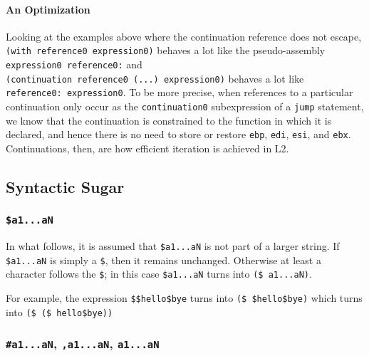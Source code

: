 \documentclass[]{article}
\let\oldparagraph\paragraph
\renewcommand{\paragraph}[1]{\oldparagraph{#1}\mbox{}}
\begin{document}
\hypertarget{an-optimization}{%
\paragraph{An Optimization}\label{an-optimization}}

Looking at the examples above where the continuation reference does not
escape, \texttt{(with\ reference0\ expression0)} behaves a lot like the
pseudo-assembly \texttt{expression0\ reference0:} and
\texttt{(continuation\ reference0\ (...)\ expression0)} behaves a lot
like \texttt{reference0:\ expression0}. To be more precise, when
references to a particular continuation only occur as the
\texttt{continuation0} subexpression of a \texttt{jump} statement, we
know that the continuation is constrained to the function in which it is
declared, and hence there is no need to store or restore \texttt{ebp},
\texttt{edi}, \texttt{esi}, and \texttt{ebx}. Continuations, then, are
how efficient iteration is achieved in L2.

\hypertarget{syntactic-sugar}{%
\subsection{Syntactic Sugar}\label{syntactic-sugar}}

\hypertarget{ux24a1...an}{%
\subsubsection{\texorpdfstring{\texttt{\$a1...aN}}{\$a1...aN}}\label{ux24a1...an}}

In what follows, it is assumed that \texttt{\$a1...aN} is not part of a
larger string. If \texttt{\$a1...aN} is simply a \texttt{\$}, then it
remains unchanged. Otherwise at least a character follows the
\texttt{\$}; in this case \texttt{\$a1...aN} turns into
\texttt{(\$\ a1...aN)}.

For example, the expression \texttt{\$\$hello\$bye} turns into
\texttt{(\$\ \$hello\$bye)} which turns into
\texttt{(\$\ (\$\ hello\$bye))}

\hypertarget{ux5cux23a1...anux2c-ux2ca1...anux2c-ux60a1...an}{%
\subsubsection{\texorpdfstring{\texttt{\#a1...aN}, \texttt{,a1...aN},
\texttt{\textasciigrave{}a1...aN}}{\#a1...aN, ,a1...aN, `a1...aN}}\label{ux5cux23a1...anux2c-ux2ca1...anux2c-ux60a1...an}}
\end{document}
